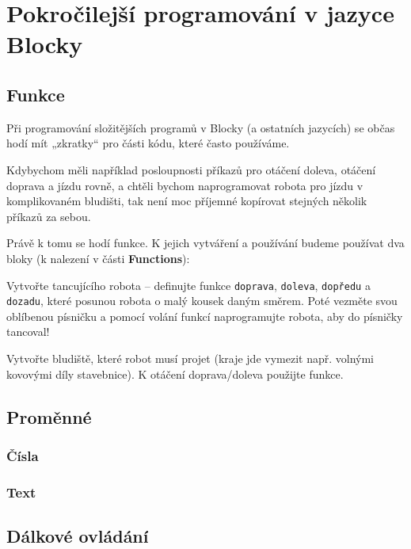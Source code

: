 \documentclass[../main.tex]{subfiles}
\begin{document}
	\section{Pokročilejší programování v jazyce Blocky}

	\subsection{Funkce}
	Při programování složitějších programů v Blocky (a ostatních jazycích) se občas hodí mít „zkratky“ pro části kódu, které často používáme.

	Kdybychom měli například posloupnosti příkazů pro otáčení doleva, otáčení doprava a jízdu rovně, a chtěli bychom naprogramovat robota pro jízdu v komplikovaném bludišti, tak není moc příjemné kopírovat stejných několik příkazů za sebou.

	Právě k tomu se hodí funkce. K jejich vytváření a používání budeme používat dva bloky (k nalezení v části \textbf{Functions}):
	\begin{itemize}
		\blockFunctionDefinition
		\blockFunctionCall
	\end{itemize}

	\begin{question*}
		Vytvořte tancujícího robota -- definujte funkce \texttt{doprava}, \texttt{doleva}, \texttt{dopředu} a \texttt{dozadu}, které posunou robota o malý kousek daným směrem. Poté vezměte svou oblíbenou písničku a pomocí volání funkcí naprogramujte robota, aby do písničky tancoval!
	\end{question*}

	\begin{question*}
		Vytvořte bludiště, které robot musí projet (kraje jde vymezit např. volnými kovovými díly stavebnice). K otáčení doprava/doleva použijte funkce.
	\end{question*}

	\subsection{Proměnné}

	\subsubsection{Čísla}

	\subsubsection{Text}

	\subsection{Dálkové ovládání}
\end{document}
